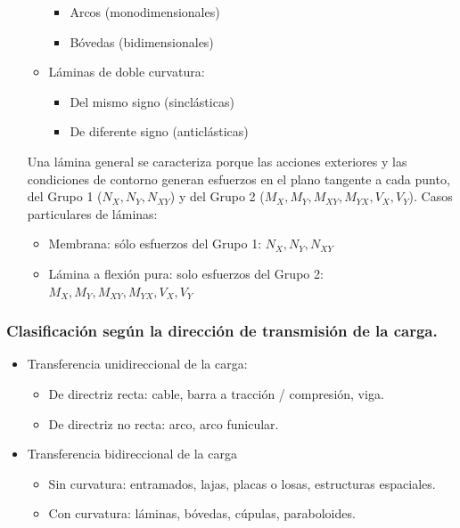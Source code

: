 \begin{itemize}
\begin{itemize}
        \begin{itemize}
            \item Arcos (monodimensionales)
            \item Bóvedas (bidimensionales)
        \end{itemize}
        \item Láminas de doble curvatura:
        \begin{itemize}
            \item Del mismo signo (sinclásticas)
            \item De diferente signo (anticlásticas)
        \end{itemize}
    \end{itemize}
    Una lámina general se caracteriza porque las acciones exteriores y las condiciones de contorno generan esfuerzos en el plano tangente a cada punto, del Grupo 1 ($N_X , N_Y, N_{XY}$) y del Grupo 2 ($M_X, M_Y, M_{XY}, M_{YX}, V_X, V_Y$). Casos particulares de láminas:
    \begin{itemize}
        \item Membrana: sólo esfuerzos del Grupo 1: $N_X , N_Y, N_{XY}$
        \item Lámina a flexión pura: solo esfuerzos del Grupo 2: $M_X, M_Y, M_{XY}, M_{YX}, V_X, V_Y$
    \end{itemize}
\end{itemize}

\subsubsection{Clasificación según la dirección de transmisión de la carga.}
\begin{itemize}
    \item Transferencia unidireccional de la carga:
    \begin{itemize}
        \item De directriz recta: cable, barra a tracción / compresión, viga.
        \item De directriz no recta: arco, arco funicular.
    \end{itemize}
    \item Transferencia bidireccional de la carga
    \begin{itemize}
        \item Sin curvatura: entramados, lajas, placas o losas, estructuras espaciales.
        \item Con curvatura: láminas, bóvedas, cúpulas, paraboloides.
    \end{itemize}
\end{itemize}

